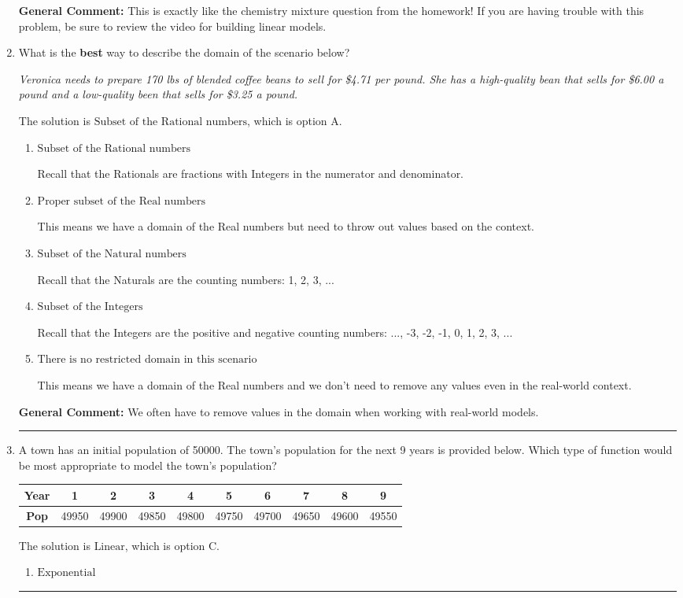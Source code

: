 \documentclass{extbook}[14pt]
\newcommand{\litem}[1]{\item #1

\rule{\textwidth}{0.4pt}}
\begin{document}
\begin{enumerate}
{\textbf{General Comment:} This is exactly like the chemistry mixture question from the homework! If you are having trouble with this problem, be sure to review the video for building linear models.
}
\litem{
What is the \textbf{best} way to describe the domain of the scenario below?

\begin{center}
    \textit{ Veronica needs to prepare 170 lbs of blended coffee beans to sell for \$4.71 per pound. She has a high-quality bean that sells for \$6.00 a pound and a low-quality been that sells for \$3.25 a pound. }
\end{center}
The solution is \( \text{Subset of the Rational numbers} \), which is option A.\begin{enumerate}[label=\Alph*.]
\item \( \text{Subset of the Rational numbers} \)

Recall that the Rationals are fractions with Integers in the numerator and denominator.
\item \( \text{Proper subset of the Real numbers} \)

This means we have a domain of the Real numbers but need to throw out values based on the context.
\item \( \text{Subset of the Natural numbers} \)

Recall that the Naturals are the counting numbers: 1, 2, 3, ...
\item \( \text{Subset of the Integers} \)

Recall that the Integers are the positive and negative counting numbers: ..., -3, -2, -1, 0, 1, 2, 3, ... 
\item \( \text{There is no restricted domain in this scenario} \)

This means we have a domain of the Real numbers and we don't need to remove any values even in the real-world context.
\end{enumerate}

\textbf{General Comment:} We often have to remove values in the domain when working with real-world models.
}
\litem{
A town has an initial population of 50000. The town's population for the next 9 years is provided below. Which type of function would be most appropriate to model the town's population?


\begin{tabular}{c|c|c|c|c|c|c|c|c|c}
\textbf{Year} &1 &2 &3 &4 &5 &6 &7 &8 &9\tabularnewline \hline
\textbf{Pop} &49950 &49900 &49850 &49800 &49750 &49700 &49650 &49600 &49550\end{tabular}The solution is \( \text{Linear} \), which is option C.\begin{enumerate}[label=\Alph*.]
\item \( \text{Exponential} \)


\end{enumerate}}
\end{enumerate}
\end{document}
